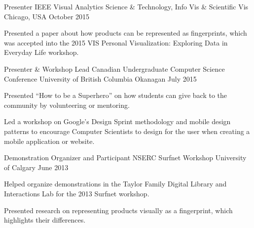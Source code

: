 \begin{cventries}
  \cventry
    {Presenter}
    {IEEE Visual Analytics Science \& Technology, Info Vis \& Scientific Vis}
    {Chicago, USA}
    {October 2015}
    {
      \begin{cvitems}
        \item {Presented a paper about how products can be represented as fingerprints, which was accepted into the 2015 VIS Personal Visualization: Exploring Data in Everyday Life workshop.}
      \end{cvitems}
    }
  \cventry
    {Presenter \& Workshop Lead}
    {Canadian Undergraduate Computer Science Conference}
    {University of British Columbia Okanagan}
    {July 2015}
    {
      \begin{cvitems}
        \item {Presented ``How to be a Superhero'' on how students can give back to the community by volunteering or mentoring.}
        \item {Led a workshop on Google’s Design Sprint methodology and mobile design patterns to encourage Computer Scientists to design for the user when creating a mobile application or website.}
      \end{cvitems}
    }
  \cventry
    {Demonstration Organizer and Participant}
    {NSERC Surfnet Workshop}
    {University of Calgary}
    {June 2013}
    {
      \begin{cvitems}
        \item {Helped organize demonstrations in the Taylor Family Digital Library and Interactions Lab for the 2013 Surfnet workshop.}
        \item {Presented research on representing products visually as a fingerprint, which highlights their differences.}
      \end{cvitems}
    }
\end{cventries}
